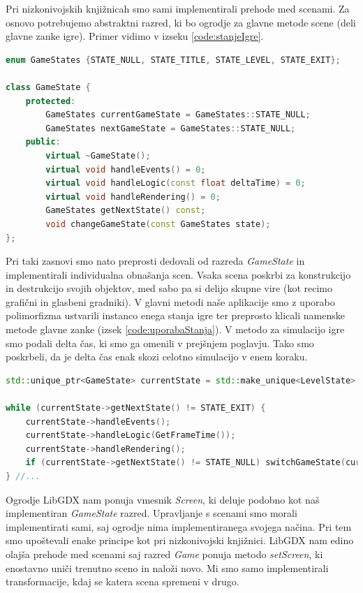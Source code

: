 \documentclass[12pt,a4paper,twoside]{book}
\begin{document}
Pri nizkonivojskih knjižnicah smo sami implementirali prehode med scenami. Za osnovo potrebujemo abstraktni razred, ki bo ogrodje za glavne metode scene (deli glavne zanke igre). Primer vidimo v izseku \ref{code:stanjeIgre}.

\begin{lstlisting}[label=code:stanjeIgre, language=C++, caption=Stanje igre]
enum GameStates {STATE_NULL, STATE_TITLE, STATE_LEVEL, STATE_EXIT};

class GameState {
	protected:
		GameStates currentGameState = GameStates::STATE_NULL;
		GameStates nextGameState = GameStates::STATE_NULL;
	public:
		virtual ~GameState();
		virtual void handleEvents() = 0;
		virtual void handleLogic(const float deltaTime) = 0;
		virtual void handleRendering() = 0;
		GameStates getNextState() const;
		void changeGameState(const GameStates state);
};
\end{lstlisting}

Pri taki zasnovi smo nato preprosti dedovali od razreda \textit{GameState} in implementirali individualna obnašanja scen. Vsaka scena poskrbi za konstrukcijo in destrukcijo svojih objektov, med sabo pa si delijo skupne vire (kot recimo grafični in glasbeni gradniki). V glavni metodi naše aplikacije smo z uporabo polimorfizma ustvarili instanco enega stanja igre ter preprosto klicali namenske metode glavne zanke (izsek \ref{code:uporabaStanja}). V metodo za simulacijo igre smo podali delta čas, ki smo ga omenili v prejšnjem poglavju. Tako smo poskrbeli, da je delta čas enak skozi celotno simulacijo v enem koraku.

\begin{lstlisting}[label=code:uporabaStanja, language=C++, caption=Uporaba stanja igre]
std::unique_ptr<GameState> currentState = std::make_unique<LevelState>();

while (currentState->getNextState() != STATE_EXIT) {
	currentState->handleEvents();
	currentState->handleLogic(GetFrameTime());
	currentState->handleRendering();
	if (currentState->getNextState() != STATE_NULL) switchGameState(currentState);
} //...
\end{lstlisting}

Ogrodje LibGDX nam ponuja vmesnik \textit{Screen}, ki deluje podobno kot naš implementiran \textit{GameState} razred. Upravljanje s scenami smo morali implementirati sami, saj ogrodje nima implementiranega svojega načina. Pri tem smo upoštevali enake principe kot pri nizkonivojski knjižnici. LibGDX nam edino olajša prehode med scenami saj razred \textit{Game} ponuja metodo \textit{setScreen}, ki enostavno uniči trenutno sceno in naloži novo. Mi smo samo implementirali transformacije, kdaj se katera scena spremeni v drugo.
\end{document}
